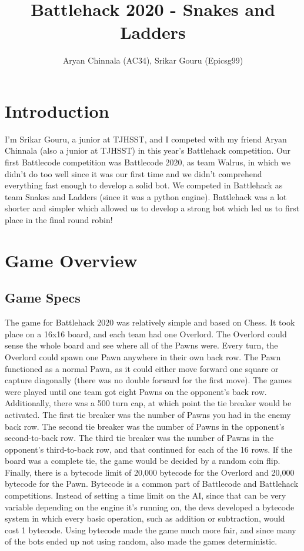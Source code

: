 \documentclass{article}
\title{Battlehack 2020 - Snakes and Ladders}
\author{Aryan Chinnala (AC34), Srikar Gouru (Epicsg99)}
\begin{document}
\maketitle

\section{Introduction}
\hspace{\parindent}
I’m Srikar Gouru, a junior at TJHSST, and I competed with my friend Aryan Chinnala (also a junior at TJHSST) in this year’s Battlehack competition. Our first Battlecode competition was Battlecode 2020, as team Walrus, in which we didn’t do too well since it was our first time and we didn’t comprehend everything fast enough to develop a solid bot. We competed in Battlehack as team Snakes and Ladders (since it was a python engine). Battlehack was a lot shorter and simpler which allowed us to develop a strong bot which led us to first place in the final round robin!

\section{Game Overview}

\subsection{Game Specs}
\hspace{\parindent}
The game for Battlehack 2020 was relatively simple and based on Chess. It took place on a 16x16 board, and each team had one Overlord. The Overlord could sense the whole board and see where all of the Pawns were. Every turn, the Overlord could spawn one Pawn anywhere in their own back row.  The Pawn functioned as a normal Pawn, as it could either move forward one square or capture diagonally (there was no double forward for the first move). The games were played until one team got eight Pawns on the opponent's back row.
\bigbreak
Additionally, there was a 500 turn cap, at which point the tie breaker would be activated. The first tie breaker was the number of Pawns you had in the enemy back row. The second tie breaker was the number of Pawns in the opponent’s second-to-back row. The third tie breaker was the number of Pawns in the opponent’s third-to-back row, and that continued for each of the 16 rows. If the board was a complete tie, the game would be decided by a random coin flip.
\bigbreak
Finally, there is a bytecode limit of 20,000 bytecode for the Overlord and 20,000 bytecode for the Pawn. Bytecode is a common part of Battlecode and Battlehack competitions. Instead of setting a time limit on the AI, since that can be very variable depending on the engine it’s running on, the devs developed a bytecode system in which every basic operation, such as addition or subtraction, would cost 1 bytecode. Using bytecode made the game much more fair, and since many of the bots ended up not using random, also made the games deterministic.
\end{document}
